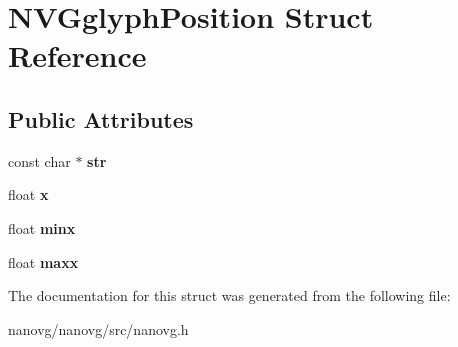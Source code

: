 \hypertarget{struct_n_v_gglyph_position}{\section{N\+V\+Gglyph\+Position Struct Reference}
\label{struct_n_v_gglyph_position}
}
\subsection*{Public Attributes}
\begin{DoxyCompactItemize}
\item 
\hypertarget{struct_n_v_gglyph_position_a62e56b71765965db1a72812af0e733f1}{const char $\ast$ {\bfseries str}}\label{struct_n_v_gglyph_position_a62e56b71765965db1a72812af0e733f1}

\item 
\hypertarget{struct_n_v_gglyph_position_a45c4fbe8ff3c9e654b681fd57588037e}{float {\bfseries x}}\label{struct_n_v_gglyph_position_a45c4fbe8ff3c9e654b681fd57588037e}

\item 
\hypertarget{struct_n_v_gglyph_position_a0748c4dc5092c68fab56e61e2199469c}{float {\bfseries minx}}\label{struct_n_v_gglyph_position_a0748c4dc5092c68fab56e61e2199469c}

\item 
\hypertarget{struct_n_v_gglyph_position_ae48bc6e37bb1eca8fc501951058b3801}{float {\bfseries maxx}}\label{struct_n_v_gglyph_position_ae48bc6e37bb1eca8fc501951058b3801}

\end{DoxyCompactItemize}


The documentation for this struct was generated from the following file\+:\begin{DoxyCompactItemize}
\item 
nanovg/nanovg/src/nanovg.\+h\end{DoxyCompactItemize}
